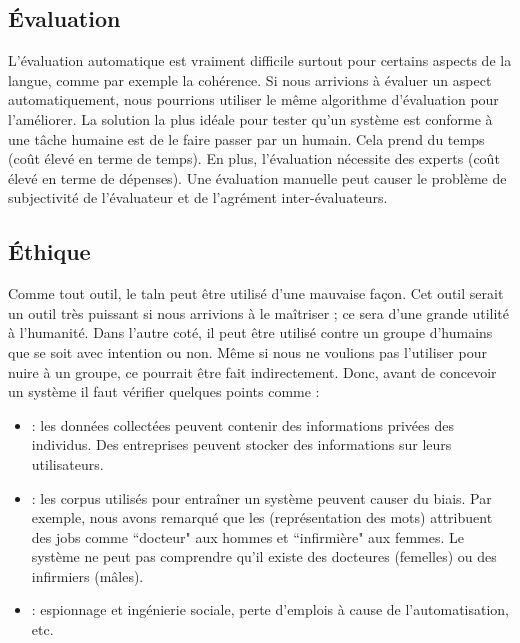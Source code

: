 \documentclass{KodeBook}
\begin{document}
\subsection{Évaluation}

L'évaluation automatique est vraiment difficile surtout pour certains aspects de la langue, comme par exemple la cohérence. 
Si nous arrivions à évaluer un aspect automatiquement, nous pourrions utiliser le même algorithme d'évaluation pour l'améliorer. 
La solution la plus idéale pour tester qu'un système est conforme à une tâche humaine est de le faire passer par un humain.
Cela prend du temps (coût élevé en terme de temps). 
En plus, l'évaluation nécessite des experts (coût élevé en terme de dépenses).
Une évaluation manuelle peut causer le problème de subjectivité de l'évaluateur et de l'agrément inter-évaluateurs.

\subsection{Éthique}

Comme tout outil, le \ac{taln} peut être utilisé d'une mauvaise façon. 
Cet outil serait un outil très puissant si nous arrivions à le maîtriser ; ce sera d'une grande utilité à l'humanité. 
Dans l'autre coté, il peut être utilisé contre un groupe d'humains que se soit avec intention ou non. 
Même si nous ne voulions pas l'utiliser pour nuire à un groupe, ce pourrait être fait indirectement. 
Donc, avant de concevoir un système il faut vérifier quelques points comme :
\begin{itemize}
	\item {} : les données collectées peuvent contenir des informations privées des individus. Des entreprises peuvent stocker des informations sur leurs utilisateurs. 
	\item {} : les corpus utilisés pour entraîner un système peuvent causer du biais.
	Par exemple, nous avons remarqué que les  (représentation des mots) attribuent des jobs comme ``docteur" aux hommes et ``infirmière" aux femmes. 
	Le système ne peut pas comprendre qu'il existe des docteures (femelles) ou des infirmiers (mâles).
	\item {} : espionnage et ingénierie sociale, perte d'emplois à cause de l'automatisation, etc.
\end{itemize}
\end{document}
